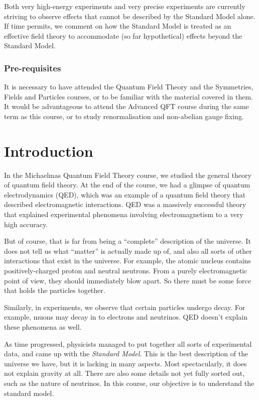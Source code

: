 \documentclass[a4paper]{article}
\begin{document}
{Both very high-energy experiments and very precise experiments are currently striving to observe effects that cannot be described by the Standard Model alone. If time permits, we comment on how the Standard Model is treated as an effective field theory to accommodate (so far hypothetical) effects beyond the Standard Model.

\subsubsection*{Pre-requisites}
It is necessary to have attended the Quantum Field Theory and the Symmetries, Fields and Particles courses, or to be familiar with the material covered in them. It would be advantageous to attend the Advanced QFT course during the same term as this course, or to study renormalisation and non-abelian gauge fixing.
}
\tableofcontents

\setcounter{section}{-1}
\section{Introduction}
In the Michaelmas Quantum Field Theory course, we studied the general theory of quantum field theory. At the end of the course, we had a glimpse of quantum electrodynamics (QED), which was an example of a quantum field theory that described electromagnetic interactions. QED was a massively successful theory that explained experimental phenomena involving electromagnetism to a very high accuracy.

But of course, that is far from being a ``complete'' description of the universe. It does not tell us what ``matter'' is actually made up of, and also all sorts of other interactions that exist in the universe. For example, the atomic nucleus contains positively-charged proton and neutral neutrons. From a purely electromagnetic point of view, they should immediately blow apart. So there must be some force that holds the particles together.

Similarly, in experiments, we observe that certain particles undergo decay. For example, muons may decay in to electrons and neutrinos. QED doesn't explain these phenomena as well.

As time progressed, physicists managed to put together all sorts of experimental data, and came up with the \emph{Standard Model}. This is the best description of the universe we have, but it is lacking in many aspects. Most spectacularly, it does not explain gravity at all. There are also some details not yet fully sorted out, such as the nature of neutrinos. In this course, our objective is to understand the standard model.
\end{document}

